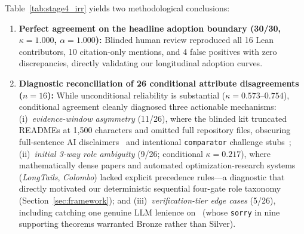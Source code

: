 \documentclass[11pt,letterpaper]{article}
\begin{document}
Table~\ref{tab:stage4_irr} yields two methodological conclusions:
\begin{enumerate}
  \item \textbf{Perfect agreement on the headline adoption boundary (30/30, $\kappa = 1.000$, $\alpha = 1.000$):} Blinded human review reproduced all 16 Lean contributors, 10 citation-only mentions, and 4 false positives with zero discrepancies, directly validating our longitudinal adoption curves.
  \item \textbf{Diagnostic reconciliation of 26 conditional attribute disagreements ($n = 16$):} While unconditional reliability is substantial ($\kappa = 0.573$--$0.754$), conditional agreement cleanly diagnosed three actionable mechanisms: (i)~\emph{evidence-window asymmetry} (11/26), where the blinded kit truncated READMEs at 1,500 characters and omitted full repository files, obscuring full-sentence AI disclaimers~\cite{arxiv2605_14610,arxiv2611_02256,arxiv2611_08172,arxiv2611_10810} and intentional \texttt{comparator} challenge stubs~\cite{arxiv2611_04876}; (ii)~\emph{initial 3-way role ambiguity} (9/26; conditional $\kappa = 0.217$), where mathematically dense papers and automated optimization-research systems (\emph{LongTails}, \emph{Colombo}) lacked explicit precedence rules---a diagnostic that directly motivated our deterministic sequential four-gate role taxonomy (Section~\ref{sec:framework}); and (iii)~\emph{verification-tier edge cases} (5/26), including catching one genuine LLM lenience on~\cite{arxiv2611_16690} (whose \texttt{sorry} in nine supporting theorems warranted Bronze rather than Silver).
\end{enumerate}
\end{document}
